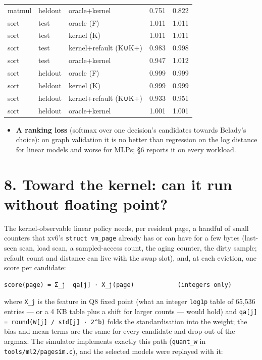 \documentclass[10pt,a4paper]{article}
\newcommand{\code}[1]{\texttt{#1}}
\begin{document}
{\begin{longtable}{lllrr}
matmul & heldout & oracle+kernel & 0.751 & 0.822 \\
sort & test & oracle (F) & 1.011 & 1.011 \\
sort & test & kernel (K) & 1.011 & 1.011 \\
sort & test & kernel+refault (K∪K+) & 0.983 & 0.998 \\
sort & test & oracle+kernel & 0.947 & 1.012 \\
sort & heldout & oracle (F) & 0.999 & 0.999 \\
sort & heldout & kernel (K) & 0.999 & 0.999 \\
sort & heldout & kernel+refault (K∪K+) & 0.933 & 0.951 \\
sort & heldout & oracle+kernel & 1.001 & 1.001 \\
\bottomrule
\end{longtable}}

\begin{itemize}
\item \textbf{A ranking loss} (softmax over one decision's candidates towards Belady's choice): on graph validation it is no better than regression on the log distance for linear models and worse for MLPs; §6 reports it on every workload.
\end{itemize}

\section*{8. Toward the kernel: can it run without floating point?}

The kernel-observable linear policy needs, per resident page, a handful of small counters that xv6's \code{struct vm\_\allowbreak{}page} already has or can have for a few bytes (last-seen scan, load scan, a sampled-access count, the aging counter, the dirty sample; refault count and distance can live with the swap slot), and, at each eviction, one score per candidate:

\begin{Verbatim}[fontsize=\scriptsize,xleftmargin=1em]
score(page) = Σ_j  qa[j] · X_j(page)            (integers only)
\end{Verbatim}

where \code{X\_\allowbreak{}j} is the feature in Q8 fixed point (what an integer \code{log1p} table of 65,536 entries — or a 4 KB table plus a shift for larger counts — would hold) and \code{qa[j] = round(W[j] /\allowbreak{} std[j] · 2\^{}b)} folds the standardisation into the weight; the bias and mean terms are the same for every candidate and drop out of the argmax. The simulator implements exactly this path (\code{quant\_\allowbreak{}w} in \code{tools/\allowbreak{}ml2/\allowbreak{}pagesim.\allowbreak{}c}), and the selected models were replayed with it:
\end{document}
